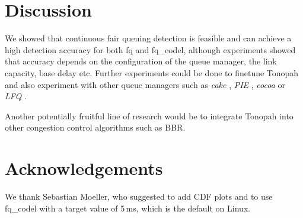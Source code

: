 \documentclass[conference]{IEEEtran}
\begin{document}
\section{Discussion}

We showed that continuous fair queuing detection is feasible and can achieve a high detection accuracy for both fq and fq\_codel, although experiments showed that accuracy depends on the configuration of the queue manager, 
the link capacity, base delay etc. Further experiments could be done to finetune Tonopah and also experiment with other queue managers such as \textit{cake} \cite{hoiland-jorgensen_piece_2018}, \textit{PIE} \cite{pan_pie_2013}, \textit{cocoa} \cite{bachl_cocoa_2019} or \textit{LFQ} \cite{bachl_lfq_2020}. 

Another potentially fruitful line of research would be to integrate Tonopah into other congestion control algorithms such as BBR. 

\section*{Acknowledgements}

We thank Sebastian Moeller, who suggested to add CDF plots and to use fq\_codel with a target value of 5\,ms, which is the default on Linux. 



\end{document}
